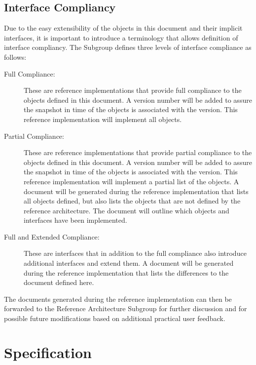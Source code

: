 \documentclass[10pt]{article}
\begin{document}
\subsection{Interface Compliancy}

Due to the easy extensibility of the objects in this document and their implicit
interfaces, it is important to introduce a terminology that allows 
definition of interface compliancy. The Subgroup defines three levels of interface compliance 
as follows:

\begin{description}

\item[Full Compliance:] These are reference implementations that
  provide full compliance to the objects defined in this document. A
  version number will be added to assure the snapshot in time of the
  objects is associated with the version. This reference
  implementation will implement all objects.

\item[Partial Compliance:] These are reference implementations that
  provide partial compliance to the objects defined in this
  document. A version number will be added to assure the snapshot in
  time of the objects is associated with the version. This reference
  implementation will implement a partial list of the objects. A
  document will be generated during the reference implementation 
  that lists all objects defined, but also
  lists the objects that are not defined by the reference
  architecture. The document will outline which objects and interfaces
  have been implemented.

\item[Full and Extended Compliance:] These are interfaces that in
  addition to the full compliance also introduce additional interfaces
  and extend them. A document will be generated during the reference implementation 
  that lists the
  differences to the document defined here.

\end{description}

The  documents  generated during the reference implementation 
can then be forwarded to the Reference Architecture Subgroup for further
discussion and for possible future modifications based on additional
practical user feedback.



\section{Specification}
\end{document}
